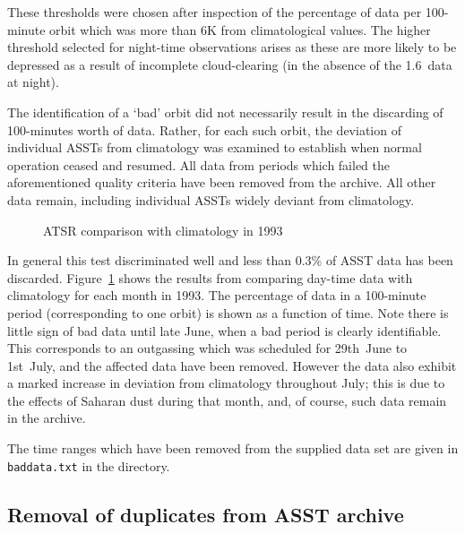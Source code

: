 These thresholds were chosen after inspection of the percentage of
data per 100-minute orbit which was more than 6K from climatological
values.
The higher threshold selected for night-time observations arises
as these are more likely to be depressed as a result of incomplete 
cloud-clearing (in the absence of the 1.6\mic\ data at night).

The identification of a `bad' orbit did not necessarily result
in the discarding of 100-minutes worth of data.
Rather, for each such orbit,  the deviation of individual ASSTs 
from climatology was examined to establish when normal
operation ceased and resumed.
All data from periods which failed the aforementioned quality criteria 
have been removed from the archive.
All other data remain, including individual ASSTs widely deviant from 
climatology.


\begin{figure}
\caption{ATSR comparison with climatology in 1993}
\label{fig:clim}
\vspace{10cm}
\end{figure}

In general this test discriminated well and less than 0.3\% of ASST data has
been discarded.
Figure~\ref{fig:clim} shows the results from comparing day-time 
data with climatology for each month in 1993. The percentage of data in 
a 100-minute period (corresponding to one orbit) is shown as a function of time.
Note there is little sign of bad data until late June, when a 
bad period is clearly identifiable. This corresponds to an outgassing 
which was scheduled for 29th~June to 1st~July, and the affected data 
have been removed.
However the data also exhibit a marked increase in deviation from
climatology throughout July;
this is due to the effects of Saharan dust during that month, and, 
of course, such data remain in the archive.

The time ranges which have been removed from the supplied data set
are given in {\tt baddata.txt} in the  directory.


\subsection{Removal of duplicates from ASST archive}

